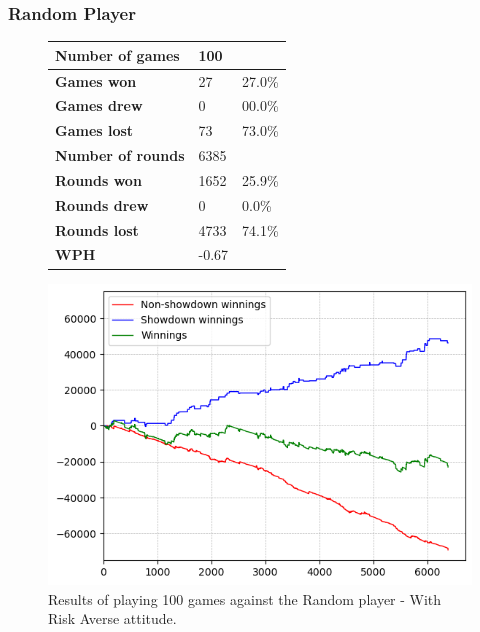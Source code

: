 \subsubsection{Random Player}
\begin{figure}[H]
    \centering
    \begin{minipage}{\textwidth}
        \begin{minipage}{0.40\textwidth}
            \begin{tabular}{|l|l|l|}
                \hline
                \textbf{Number of games}  & 100   &        \\ \hline
                \textbf{Games won}        & 27    & 27.0\% \\ \hline
                \textbf{Games drew}       & 0     & 00.0\%  \\ \hline
                \textbf{Games lost}       & 73    & 73.0\% \\ \hline
                \textbf{Number of rounds} & 6385  &        \\ \hline
                \textbf{Rounds won}       & 1652   & 25.9\%  \\ \hline
                \textbf{Rounds drew}      & 0     & 0.0\%  \\ \hline
                \textbf{Rounds lost}      & 4733  & 74.1\% \\ \hline
                \textbf{WPH}              & -0.67 &        \\ \hline
            \end{tabular}
        \end{minipage}
        \hspace{0.05\textwidth}
        \begin{minipage}{0.5\textwidth}
            \includegraphics[width=\textwidth]{graphics/risk-averse/random.png}
        \end{minipage}
    \end{minipage}
    \caption{Results of playing 100 games against the Random player - With Risk Averse attitude.}
    \label{fig:results_averse_random}
\end{figure}


